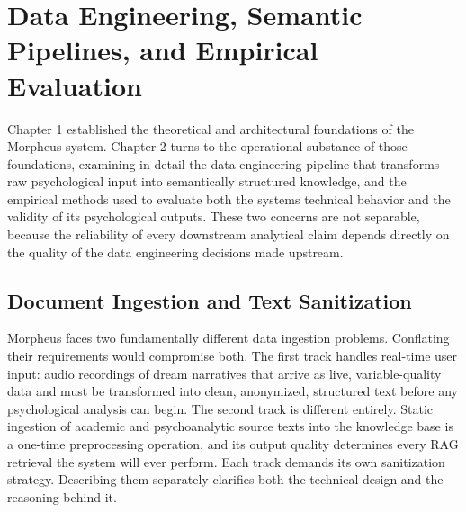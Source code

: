 \documentclass[12pt,a4paper]{report}
\begin{document}
\chapter{Data Engineering, Semantic Pipelines, and Empirical Evaluation}
Chapter 1 established the theoretical and architectural foundations of the Morpheus system. Chapter 2 turns to the operational substance of those foundations, examining in detail the data engineering pipeline that transforms raw psychological input into semantically structured knowledge, and the empirical methods used to evaluate both the system\textquotesingle{}s technical behavior and the validity of its psychological outputs. These two concerns are not separable, because the reliability of every downstream analytical claim depends directly on the quality of the data engineering decisions made upstream.

\section{Document Ingestion and Text Sanitization}
Morpheus faces two fundamentally different data ingestion problems. Conflating their requirements would compromise both. The first track handles real-time user input: audio recordings of dream narratives that arrive as live, variable-quality data and must be transformed into clean, anonymized, structured text before any psychological analysis can begin. The second track is different entirely. Static ingestion of academic and psychoanalytic source texts into the knowledge base is a one-time preprocessing operation, and its output quality determines every RAG retrieval the system will ever perform. Each track demands its own sanitization strategy. Describing them separately clarifies both the technical design and the reasoning behind it.
\end{document}
